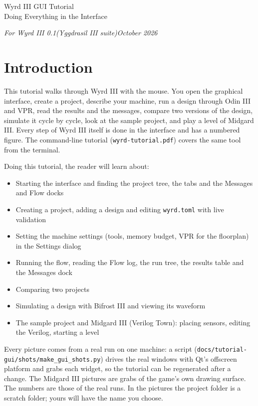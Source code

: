 \documentclass[11pt]{article}
\newcommand{\cmd}[1]{\texttt{#1}}
\begin{document}
\begin{center}
{\sffamily\LARGE Wyrd III GUI Tutorial\\[2pt] Doing Everything in the Interface}
\end{center}
\vspace{2pt}
\noindent\colorbox{banner}{\parbox{\dimexpr\linewidth-2\fboxsep}{\color{white}\sffamily\itshape\small For Wyrd III 0.1\quad(Yggdrasil III suite)\hfill October 2026}}

\begingroup\hypersetup{linkcolor=blue!60!black}
\renewcommand{\contentsname}{Contents}
\tableofcontents
\endgroup
\clearpage

\section{Introduction}

This tutorial walks through Wyrd III with the mouse. You open the graphical interface, create a project, describe
your machine, run a design through Odin III and VPR, read the results and the messages, compare two versions of the
design, simulate it cycle by cycle, look at the sample project, and play a level of Midgard III. Every step of Wyrd III
itself is done in the interface and has a numbered figure. The command-line tutorial (\cmd{wyrd-tutorial.pdf}) covers the same
tool from the terminal.

Doing this tutorial, the reader will learn about:
\begin{itemize}
\item Starting the interface and finding the project tree, the tabs and the Messages and Flow docks
\item Creating a project, adding a design and editing \cmd{wyrd.toml} with live validation
\item Setting the machine settings (tools, memory budget, VPR for the floorplan) in the Settings dialog
\item Running the flow, reading the Flow log, the run tree, the results table and the Messages dock
\item Comparing two projects
\item Simulating a design with Bifrost III and viewing its waveform
\item The sample project and Midgard III (Verilog Town): placing sensors, editing the Verilog, starting a level
\end{itemize}

Every picture comes from a real run on one machine: a script (\cmd{docs/tutorial-gui/shots/make\_gui\_shots.py}) drives the
real windows with Qt's offscreen platform and grabs each widget, so the tutorial can be regenerated after a change.
The Midgard III pictures are grabs of the game's own drawing surface. The numbers are those of the real runs. In the pictures
the project folder is a scratch folder; yours will have the name you choose.
\end{document}
